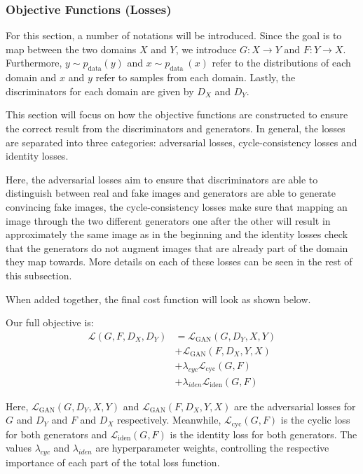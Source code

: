 \documentclass[12pt, fleqn, titlepage]{article}
\begin{document}

\subsubsection{Objective Functions (Losses)}
For this section, a number of notations will be introduced. Since the goal is to map between the two domains $X$ and $Y$, we introduce $G : X \rightarrow Y$ and $F : Y \rightarrow X$. Furthermore, $y \sim p_{\text {data}}(y)$ and $x \sim p_{\text {data }}(x)$ refer to the distributions of each domain and $x$ and $y$ refer to samples from each domain. Lastly, the discriminators for each domain are given by $D_X$ and $D_Y$.

This section will focus on how the objective functions are constructed to ensure the correct result from the discriminators and generators. In general, the losses are separated into three categories: adversarial losses, cycle-consistency losses and identity losses. 

Here, the adversarial losses aim to ensure that discriminators are able to distinguish between real and fake images and generators are able to generate convincing fake images, the cycle-consistency losses make sure that mapping an image through the two different generators one after the other will result in approximately the same image as in the beginning and the identity losses check that the generators do not augment images that are already part of the domain they map towards. More details on each of these losses can be seen in the rest of this subsection.

When added together, the final cost function will look as shown below.

Our full objective is:
\[\begin{aligned}
	\mathcal{L}\left(G, F, D_{X}, D_{Y}\right) &=\mathcal{L}_{\mathrm{GAN}}\left(G, D_{Y}, X, Y\right) \\
	&+\mathcal{L}_{\mathrm{GAN}}\left(F, D_{X}, Y, X\right) \\
	&+\lambda_{cyc} \mathcal{L}_{\mathrm{cyc}}(G, F) \\
	&+\lambda_{iden} \mathcal{L}_{\mathrm{iden}}(G, F)
\end{aligned}\]

\noindent Here, $\mathcal{L}_{\mathrm{GAN}}\left(G, D_{Y}, X, Y\right)$ and $\mathcal{L}_{\mathrm{GAN}}\left(F, D_{X}, Y, X\right)$ are the adversarial losses for $G$ and $D_Y$ and $F$ and $D_X$ respectively. Meanwhile, $\mathcal{L}_{\mathrm{cyc}}(G, F)$ is the cyclic loss for both generators and $\mathcal{L}_{\mathrm{iden}}(G, F)$ is the identity loss for both generators. The values $\lambda_{cyc}$ and $\lambda_{iden}$ are hyperparameter weights, controlling the respective importance of each part of the total loss function.
\end{document}
